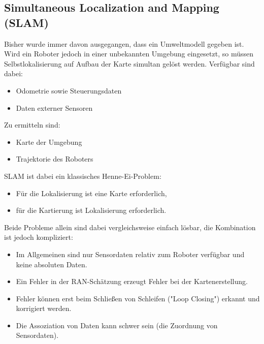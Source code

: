 		\subsection{Simultaneous Localization and Mapping (SLAM)}
			\label{sec:slam}
		
			Bisher wurde immer davon ausgegangen, dass ein Umweltmodell gegeben ist. Wird ein Roboter jedoch in einer unbekannten Umgebung eingesetzt, so müssen Selbstlokalisierung auf Aufbau der Karte simultan gelöst werden. Verfügbar sind dabei:
			\begin{itemize}
				\item Odometrie sowie Steuerungsdaten
				\item Daten externer Sensoren
			\end{itemize}
			Zu ermitteln sind:
			\begin{itemize}
				\item Karte der Umgebung
				\item Trajektorie des Roboters
			\end{itemize}
		
			SLAM ist dabei ein klassisches Henne-Ei-Problem:
			\begin{itemize}
				\item Für die Lokalisierung ist eine Karte erforderlich,
				\item für die Kartierung ist Lokalisierung erforderlich.
			\end{itemize}
			Beide Probleme allein sind dabei vergleichsweise einfach lösbar, die Kombination ist jedoch kompliziert:
			\begin{itemize}
				\item Im Allgemeinen sind nur Sensordaten relativ zum Roboter verfügbar und keine absoluten Daten.
				\item Ein Fehler in der RAN-Schätzung erzeugt Fehler bei der Kartenerstellung.
				\item Fehler können erst beim Schließen von Schleifen ("Loop Closing") erkannt und korrigiert werden.
				\item Die Assoziation von Daten kann schwer sein (die Zuordnung von Sensordaten).
			\end{itemize}
		
